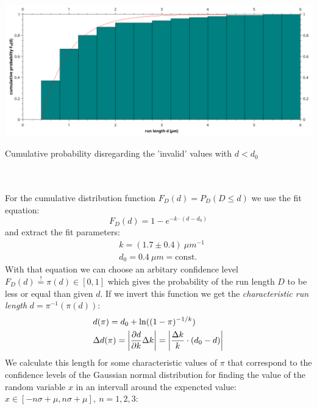     	 \minipanf
    	     	     \centering
    	     	     \captionsetup{justification=centering}            
    	     	         \includegraphics[scale=0.3]{pic/cumulative_runlength.png}
    	     	     \caption{Cumulative probability disregarding the 'invalid' values with $d < d_0$}
    	    			 \label{exp:cumuRunLength}             
    	 \minipend\\
    	 \ \\
    	 For the cumulative distribution function $F_D(d) = P_D(D \leq d)$ we use the fit equation:\\
    	 \begin{equation*}
    	     	 	F_D(d) = 1- e^{-k\cdot(d-d_0)}
    	 \end{equation*}
    	 and extract the fit parameters:
    	 \begin{align*}
    	     	  	&k = (1.7 \pm 0.4)\ \unit{\mu m^{-1}}\\
    	     	  	&d_0 = 0.4\ \unit{\mu m}= \mathrm{const.}
    	 \end{align*}
    	With that equation we can choose an arbitary confidence level $F_D(d)\overset{!}{=}\pi(d) \in [0,1]$ which gives the probability of the run length $D$ to be less or equal than given $d$. If we invert this function we get the \textit{characteristic run length} $d = \pi^{-1}(\pi(d))$:
    	\begin{align*}
    			&d(\pi) = d_0 + \ln((1-\pi)^{-1/k})\\
    			&\Delta d(\pi) = \left\vert\frac{\partial d}{\partial k}\Delta k\right\vert = \left\vert\frac{\Delta k}{k}\cdot(d_0 - d)\right\vert 
    	\end{align*}
    	We calculate this length for some characteristic values of $\pi$ that correspond to the confidence levels of the Gaussian normal distribution for finding the value of the random variable $x$ in an intervall around the expencted value:  $x \in [-n\sigma + \mu, n\sigma + \mu],\ n=1,2,3$:\\
    	\ \\
